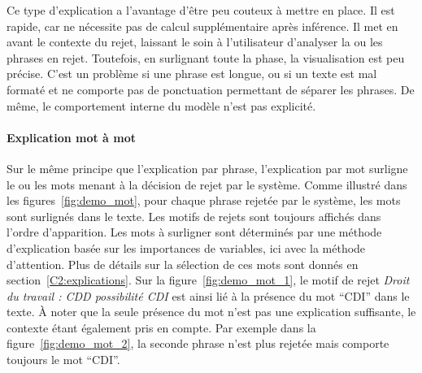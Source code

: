 Ce type d'explication a l'avantage d'être peu couteux à mettre en place. Il est rapide, car ne nécessite pas de calcul supplémentaire après inférence. Il met en avant le contexte du rejet, laissant le soin à l'utilisateur d'analyser la ou les phrases en rejet.
Toutefois, en surlignant toute la phase, la visualisation est peu précise. C'est un problème si une phrase est longue, ou si un texte est mal formaté et ne comporte pas de ponctuation permettant de séparer les phrases. De même, le comportement interne du modèle n'est pas explicité.

\paragraph{Explication mot à mot} Sur le même principe que l'explication par phrase, l'explication par mot surligne le ou les mots menant à la décision de rejet par le système. Comme illustré dans les figures~\ref{fig:demo_mot}, pour chaque phrase rejetée par le système, les mots sont surlignés dans le texte. Les motifs de rejets sont toujours affichés dans l'ordre d'apparition. Les mots à surligner sont déterminés par une méthode d'explication basée sur les importances de variables, ici avec la méthode d'attention. Plus de détails sur la sélection de ces mots sont donnés en section~\ref{C2:explications}. Sur la figure~\ref{fig:demo_mot_1}, le motif de rejet \textit{Droit du travail : CDD possibilité CDI} est ainsi lié à la présence du mot ``CDI'' dans le texte. À noter que la seule présence du mot n'est pas une explication suffisante, le contexte étant également pris en compte. Par exemple dans la figure~\ref{fig:demo_mot_2}, la seconde phrase n'est plus rejetée mais comporte toujours le mot ``CDI''.

